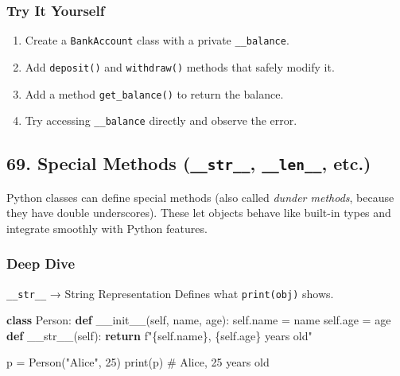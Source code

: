 \documentclass[
  letterpaper,
  DIV=11,
  numbers=noendperiod]{scrreprt}
\newenvironment{Shaded}{\begin{snugshade}}{\end{snugshade}}
\newcommand{\BuiltInTok}[1]{\textcolor[rgb]{0.00,0.23,0.31}{#1}}
\newcommand{\CommentTok}[1]{\textcolor[rgb]{0.37,0.37,0.37}{#1}}
\newcommand{\ControlFlowTok}[1]{\textcolor[rgb]{0.00,0.23,0.31}{\textbf{#1}}}
\newcommand{\DecValTok}[1]{\textcolor[rgb]{0.68,0.00,0.00}{#1}}
\newcommand{\FunctionTok}[1]{\textcolor[rgb]{0.28,0.35,0.67}{#1}}
\newcommand{\KeywordTok}[1]{\textcolor[rgb]{0.00,0.23,0.31}{\textbf{#1}}}
\newcommand{\NormalTok}[1]{\textcolor[rgb]{0.00,0.23,0.31}{#1}}
\newcommand{\OperatorTok}[1]{\textcolor[rgb]{0.37,0.37,0.37}{#1}}
\newcommand{\SpecialCharTok}[1]{\textcolor[rgb]{0.37,0.37,0.37}{#1}}
\newcommand{\SpecialStringTok}[1]{\textcolor[rgb]{0.13,0.47,0.30}{#1}}
\newcommand{\StringTok}[1]{\textcolor[rgb]{0.13,0.47,0.30}{#1}}
\newcommand{\VariableTok}[1]{\textcolor[rgb]{0.07,0.07,0.07}{#1}}
\providecommand{\tightlist}{%
  \setlength{\itemsep}{0pt}\setlength{\parskip}{0pt}}
\begin{document}
\subsubsection{Try It Yourself}\label{try-it-yourself-67}

\begin{enumerate}
\def\labelenumi{\arabic{enumi}.}
\tightlist
\item
  Create a \texttt{BankAccount} class with a private
  \texttt{\_\_balance}.
\item
  Add \texttt{deposit()} and \texttt{withdraw()} methods that safely
  modify it.
\item
  Add a method \texttt{get\_balance()} to return the balance.
\item
  Try accessing \texttt{\_\_balance} directly and observe the error.
\end{enumerate}

\subsection{\texorpdfstring{69. Special Methods (\texttt{\_\_str\_\_},
\texttt{\_\_len\_\_},
etc.)}{69. Special Methods (\_\_str\_\_, \_\_len\_\_, etc.)}}\label{special-methods-__str__-__len__-etc.}

Python classes can define special methods (also called \emph{dunder
methods}, because they have double underscores). These let objects
behave like built-in types and integrate smoothly with Python features.

\subsubsection{Deep Dive}\label{deep-dive-68}

\texttt{\_\_str\_\_} → String Representation Defines what
\texttt{print(obj)} shows.

\begin{Shaded}
\begin{Highlighting}[]
\KeywordTok{class}\NormalTok{ Person:}
    \KeywordTok{def} \FunctionTok{\_\_init\_\_}\NormalTok{(}\VariableTok{self}\NormalTok{, name, age):}
        \VariableTok{self}\NormalTok{.name }\OperatorTok{=}\NormalTok{ name}
        \VariableTok{self}\NormalTok{.age }\OperatorTok{=}\NormalTok{ age}
    \KeywordTok{def} \FunctionTok{\_\_str\_\_}\NormalTok{(}\VariableTok{self}\NormalTok{):}
        \ControlFlowTok{return} \SpecialStringTok{f"}\SpecialCharTok{\{}\VariableTok{self}\SpecialCharTok{.}\NormalTok{name}\SpecialCharTok{\}}\SpecialStringTok{, }\SpecialCharTok{\{}\VariableTok{self}\SpecialCharTok{.}\NormalTok{age}\SpecialCharTok{\}}\SpecialStringTok{ years old"}

\NormalTok{p }\OperatorTok{=}\NormalTok{ Person(}\StringTok{"Alice"}\NormalTok{, }\DecValTok{25}\NormalTok{)}
\BuiltInTok{print}\NormalTok{(p)   }\CommentTok{\# Alice, 25 years old}
\end{Highlighting}
\end{Shaded}
\end{document}
